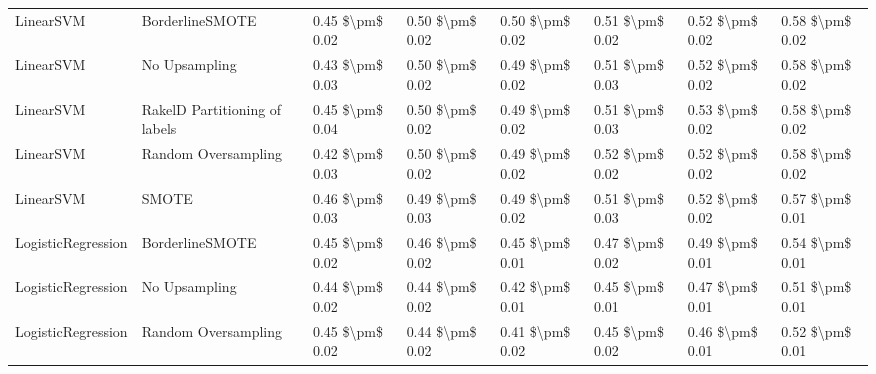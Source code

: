 \begin{tabular}{llllllll}
                      LinearSVM &               BorderlineSMOTE & 0.45 \$\textbackslash pm\$ 0.02 &           0.50 \$\textbackslash pm\$ 0.02 &       0.50 \$\textbackslash pm\$ 0.02 &        0.51 \$\textbackslash pm\$ 0.02 &                         0.52 \$\textbackslash pm\$ 0.02 &     0.58 \$\textbackslash pm\$ 0.02 \\
                      LinearSVM &                 No Upsampling & 0.43 \$\textbackslash pm\$ 0.03 &           0.50 \$\textbackslash pm\$ 0.02 &       0.49 \$\textbackslash pm\$ 0.02 &        0.51 \$\textbackslash pm\$ 0.03 &                         0.52 \$\textbackslash pm\$ 0.02 &     0.58 \$\textbackslash pm\$ 0.02 \\
                      LinearSVM & RakelD Partitioning of labels & 0.45 \$\textbackslash pm\$ 0.04 &           0.50 \$\textbackslash pm\$ 0.02 &       0.49 \$\textbackslash pm\$ 0.02 &        0.51 \$\textbackslash pm\$ 0.03 &                         0.53 \$\textbackslash pm\$ 0.02 &     0.58 \$\textbackslash pm\$ 0.02 \\
                      LinearSVM &           Random Oversampling & 0.42 \$\textbackslash pm\$ 0.03 &           0.50 \$\textbackslash pm\$ 0.02 &       0.49 \$\textbackslash pm\$ 0.02 &        0.52 \$\textbackslash pm\$ 0.02 &                         0.52 \$\textbackslash pm\$ 0.02 &     0.58 \$\textbackslash pm\$ 0.02 \\
                      LinearSVM &                         SMOTE & 0.46 \$\textbackslash pm\$ 0.03 &           0.49 \$\textbackslash pm\$ 0.03 &       0.49 \$\textbackslash pm\$ 0.02 &        0.51 \$\textbackslash pm\$ 0.03 &                         0.52 \$\textbackslash pm\$ 0.02 &     0.57 \$\textbackslash pm\$ 0.01 \\
             LogisticRegression &               BorderlineSMOTE & 0.45 \$\textbackslash pm\$ 0.02 &           0.46 \$\textbackslash pm\$ 0.02 &       0.45 \$\textbackslash pm\$ 0.01 &        0.47 \$\textbackslash pm\$ 0.02 &                         0.49 \$\textbackslash pm\$ 0.01 &     0.54 \$\textbackslash pm\$ 0.01 \\
             LogisticRegression &                 No Upsampling & 0.44 \$\textbackslash pm\$ 0.02 &           0.44 \$\textbackslash pm\$ 0.02 &       0.42 \$\textbackslash pm\$ 0.01 &        0.45 \$\textbackslash pm\$ 0.01 &                         0.47 \$\textbackslash pm\$ 0.01 &     0.51 \$\textbackslash pm\$ 0.01 \\
             LogisticRegression &           Random Oversampling & 0.45 \$\textbackslash pm\$ 0.02 &           0.44 \$\textbackslash pm\$ 0.02 &       0.41 \$\textbackslash pm\$ 0.02 &        0.45 \$\textbackslash pm\$ 0.02 &                         0.46 \$\textbackslash pm\$ 0.01 &     0.52 \$\textbackslash pm\$ 0.01 \\

\end{tabular}
